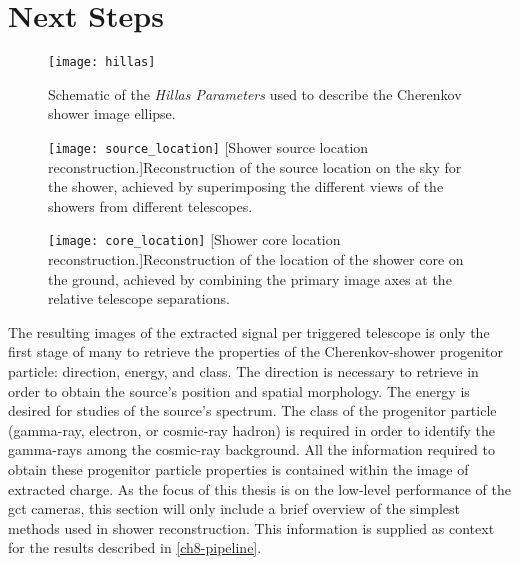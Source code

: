 \section{Next Steps}

\begin{figure}
	\centering
    \texttt{[image: hillas]} 
	\caption[Hillas Parametrisation Schematic.]{Schematic of the \textit{Hillas Parameters} used to describe the Cherenkov shower image ellipse.}
	\label{fig:hillas}
\end{figure}

\begin{figure}
\begin{minipage}[t]{.49\textwidth}
  \centering
  \texttt{[image: source\_location]} 
  [Shower source location reconstruction.]{Reconstruction of the source location on the sky for the shower, achieved by superimposing the different views of the showers from different telescopes.}
  \label{fig:source_location}
\end{minipage}%
\hfill
\begin{minipage}[t]{.49\textwidth}
  \centering
  \texttt{[image: core\_location]}
  [Shower core location reconstruction.]{Reconstruction of the location of the shower core on the ground, achieved by combining the primary image axes at the relative telescope separations.}
  \label{fig:core_location}
\end{minipage}
\end{figure}

The resulting images of the extracted signal per triggered telescope is only the first stage of many to retrieve the properties of the Cherenkov-shower progenitor particle: direction, energy, and class. The direction is necessary to retrieve in order to obtain the source's position and spatial morphology. The energy is desired for studies of the source's spectrum. The class of the progenitor particle (gamma-ray, electron, or cosmic-ray hadron) is required in order to identify the gamma-rays among the cosmic-ray background. All the information required to obtain these progenitor particle properties is contained within the image of extracted charge. As the focus of this thesis is on the low-level performance of the \gls{gct} cameras, this section will only include a brief overview of the simplest methods used in shower reconstruction. This information is supplied as context for the results described in \ref{ch8-pipeline}.


